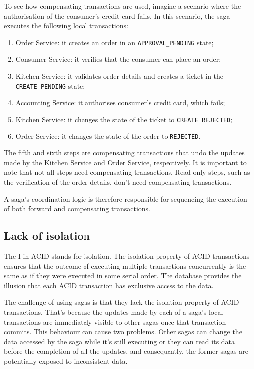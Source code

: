 \documentclass[conference]{IEEEtran}
\begin{document}
To see how compensating transactions are used, imagine a scenario where the authorisation of the consumer's credit card fails. In this scenario, the saga executes the following local transactions:

\begin{enumerate}
  \item Order Service: it creates an order in an \texttt{APPROVAL\_PENDING} state;
  \item Consumer Service: it verifies that the consumer can place an order;
  \item Kitchen Service: it validates order details and creates a ticket in the \texttt{CREATE\_PENDING} state;
  \item Accounting Service: it authorises consumer's credit card, which fails;
  \item Kitchen Service: it changes the state of the ticket to \texttt{CREATE\_REJECTED};
  \item Order Service: it changes the state of the order to \texttt{REJECTED}.
\end{enumerate}

The fifth and sixth steps are compensating transactions that undo the updates made by the Kitchen Service and Order Service, respectively. It is important to note that not all steps need compensating transactions. Read-only steps, such as the verification of the order details, don't need compensating transactions.

A saga's coordination logic is therefore responsible for sequencing the execution of both forward and compensating transactions.

\subsection{Lack of isolation}

The I in ACID stands for isolation. The isolation property of ACID transactions ensures that the outcome of executing multiple transactions concurrently is the same as if they were executed in some serial order. The database provides the illusion that each ACID transaction has exclusive access to the data.

The challenge of using sagas is that they lack the isolation property of ACID transactions. That's because the updates made by each of a saga's local transactions are immediately visible to other sagas once that transaction commits. This behaviour can cause two problems. Other sagas can change the data accessed by the saga while it's still executing or they can read its data before the completion of all the updates, and consequently, the former sagas are potentially exposed to inconsistent data.
\end{document}
